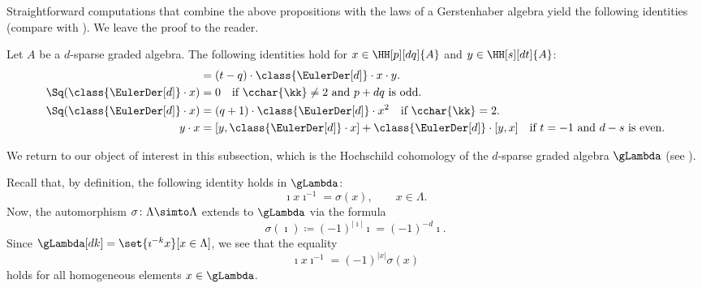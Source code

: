 \documentclass[a4paper]{amsart}
\begin{document}
Straightforward computations that combine the above propositions with the laws
of a Gerstenhaber algebra yield the following identities (compare with
\cite[Props.~3.6, 3.9, 3.10]{Mur22}). We leave the proof to the reader.

\begin{proposition}
  \label{prop:HH_computations}
  Let $A$ be a $d$-sparse graded algebra. The following identities hold for
  $x\in\HH[p][dq]{A}$ and $y\in\HH[s][dt]{A}$:
  \begin{align*}
    [\class{\EulerDer[d]}\cdot x,\class{\EulerDer[d]}\cdot y] & =(t-q)\cdot\class{\EulerDer[d]}\cdot x\cdot y.                                                          \\
    \Sq(\class{\EulerDer[d]}\cdot x)                          & =0\quad\text{if $\cchar{\kk}\neq2$ and $p+dq$ is odd.}                                                  \\
    \Sq(\class{\EulerDer[d]}\cdot x)                          & =(q+1)\cdot\class{\EulerDer[d]}\cdot x^2\quad\text{if $\cchar{\kk}=2$.}                                 \\
    y\cdot x                                                  & =[y,\class{\EulerDer[d]}\cdot x]+\class{\EulerDer[d]}\cdot[y,x]\quad\text{if $t=-1$ and $d-s$ is even.}
  \end{align*}
\end{proposition}

We return to our object of interest in this subsection, which is the Hochschild
cohomology of the $d$-sparse graded algebra $\gLambda$ (see
). 


\begin{remark}
  \label{rmk:graded_sigma}
  Recall that, by definition, the following identity
  holds in $\gLambda$:
  \[
    \imath x\imath^{-1}=\sigma(x),\qquad x\in\Lambda.
  \]
  Now, the automorphism $\sigma\colon\Lambda\simto\Lambda$ extends to $\gLambda$
  via the formula
  \[
    \sigma(\imath)\coloneqq(-1)^{|\imath|}\imath=(-1)^{-d}\imath.
  \]
  Since $\gLambda[dk]=\set{\imath^{-k}x}[x\in\Lambda]$, we see that the equality
  \[
    \imath x\imath^{-1}=(-1)^{|x|}\sigma(x)
  \]
  holds for all homogeneous elements $x\in\gLambda$.
\end{remark}
\end{document}
